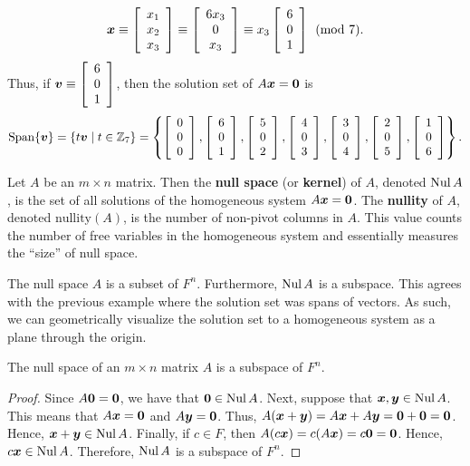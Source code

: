 \begin{Exam}
\[\bb x \equiv \vr{x_1 \\ x_2 \\ x_3} \equiv \mtx{c}{6x_3 \\ 0 \\ x_3} \equiv x_3\vr{6\\ 0 \\ 1} \pmod 7.\] Thus, if  $\bb v \equiv \vr{6 \\ 0 \\ 1}$, then the solution set of $A\bb x = \bb 0$ is \[\Span\{\bb v\} = \{t\bb v \mid t\in \Z_7\} = \left\{\vr{0\\0\\0}, \vr{6\\0\\1}, \vr{5\\0\\2}, \vr{4\\0\\3}, \vr{3\\0\\4}, \vr{2\\0\\5}, \vr{1\\0\\6}\right\}. \qedhere\]
\end{Exam}\vs

\begin{Def}\label{def:null} Let $A$ be an $m\times n$ matrix. Then the \textbf{null space} (or \textbf{kernel}) of $A$, denoted $\nul A$, is the set of all solutions of the homogeneous system $A\bb x = \bb 0$. The \textbf{nullity} of $A$, denoted $\text{nullity}(A)$, is the number of non-pivot columns in $A$. This value counts the number of free variables in the homogeneous system and essentially measures the ``size'' of null space.
\end{Def}\vs

The null space $A$ is a subset of $F^n$.  Furthermore, $\nul A$ is a subspace. This agrees with the previous example where the solution set was spans of vectors. As such, we can geometrically visualize the solution set to a homogeneous system as a plane through the origin.\\

\begin{Thm} The null space of an $m\times n$ matrix $A$ is a subspace of $F^n$.
\end{Thm}
\begin{proof}
Since $A\bb 0 = \bb 0$, we have that $\bb 0 \in \nul A$. Next, suppose that $\bb x, \bb y \in \nul A$. This means that $A\bb x = \bb 0$ and $A\bb y = \bb 0$. Thus, $A(\bb x + \bb y) = A\bb x + A\bb y = \bb 0 + \bb 0 = \bb 0$. Hence, $\bb x + \bb y \in \nul A$. Finally, if $c\in F$, then $A(c\bb x) = c(A\bb x) = c\bb 0 = \bb 0$. Hence, $c\bb x \in \nul A$. Therefore, $\nul A$ is a subspace of $F^n$.
\end{proof}\vs 

